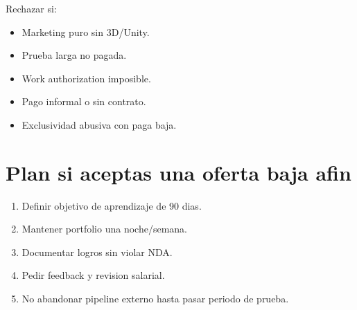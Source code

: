 Rechazar si:


\begin{itemize}
\item Marketing puro sin 3D/Unity.
\item Prueba larga no pagada.
\item Work authorization imposible.
\item Pago informal o sin contrato.
\item Exclusividad abusiva con paga baja.
\end{itemize}


\section{Plan si aceptas una oferta baja afin}


\begin{enumerate}
\item Definir objetivo de aprendizaje de 90 dias.
\item Mantener portfolio una noche/semana.
\item Documentar logros sin violar NDA.
\item Pedir feedback y revision salarial.
\item No abandonar pipeline externo hasta pasar periodo de prueba.
\end{enumerate}

